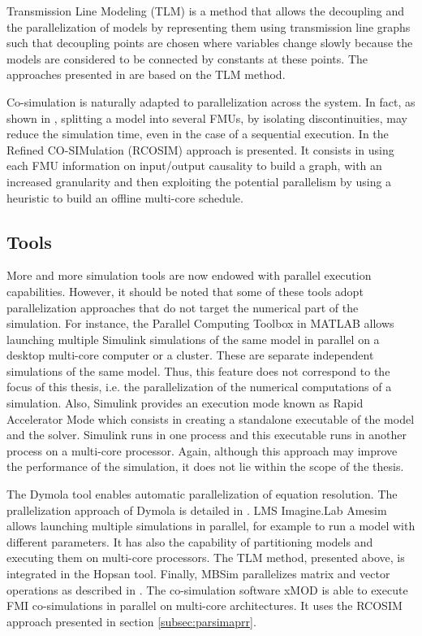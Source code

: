 Transmission Line Modeling (TLM) \cite{hui:1990} is a method that allows the decoupling and the parallelization of models by representing them using transmission line graphs such that decoupling points are chosen where variables change slowly because the models are considered to be connected by constants at these points. The approaches presented in \cite{sjolund:2010,braun:2012} are based on the TLM method. 

Co-simulation is naturally adapted to parallelization across the system. In fact, as shown in \cite{Benkhaled_A_2012_ECOSM}, splitting a model into several FMUs, by isolating discontinuities, may reduce the simulation time, even in the case of a sequential execution. In \cite{benkhaled:2014} the Refined CO-SIMulation (RCOSIM) approach is presented. It consists in using each FMU information on input/output causality to build a graph, with an increased granularity and then exploiting the potential parallelism by using a heuristic to build an offline multi-core schedule.

\subsection{Tools}

More and more simulation tools are now endowed with parallel execution capabilities. However, it should be noted that some of these tools adopt parallelization approaches that do not target the numerical part of the simulation. For instance, the Parallel Computing Toolbox in MATLAB allows launching multiple Simulink simulations of the same model in parallel on a desktop multi-core computer or a cluster. These are separate independent simulations of the same model. Thus, this feature does not correspond to the focus of this thesis, i.e. the parallelization of the numerical computations of a simulation. Also, Simulink provides an execution mode known as Rapid Accelerator Mode which consists in creating a standalone executable of the model and the solver. Simulink runs in one process and this executable runs in another process on a multi-core processor. Again, although this approach may improve the performance of the simulation, it does not lie within the scope of the thesis.

The Dymola tool enables automatic parallelization of equation resolution. The prallelization approach of Dymola is detailed in \cite{elmqvist:2014}. LMS Imagine.Lab Amesim allows launching multiple simulations in parallel, for example to run a model with different parameters. It has also the capability of partitioning models and executing them on multi-core processors. The TLM method, presented above, is integrated in the Hopsan tool. Finally, MBSim parallelizes matrix and vector operations as described in \cite{clauberg:2012}. The co-simulation software xMOD is able to execute FMI co-simulations in parallel on multi-core architectures. It uses the RCOSIM approach \cite{benkhaled:2014} presented in section \ref{subsec:parsimaprr}.  